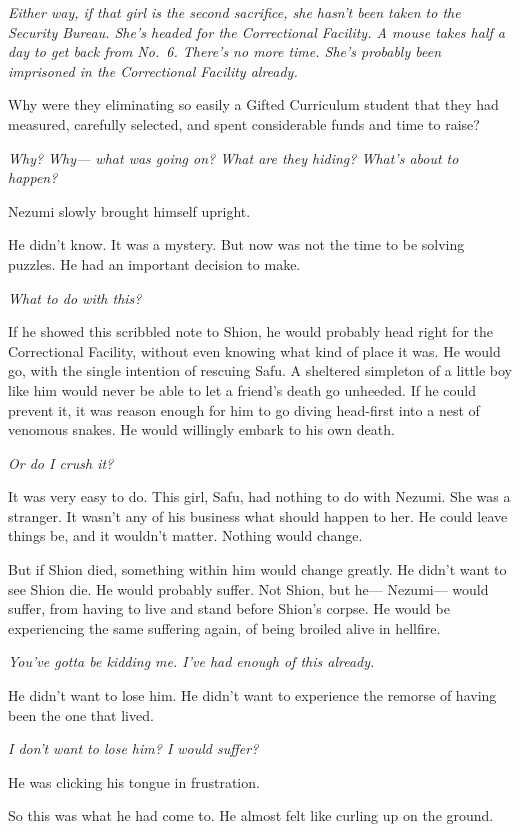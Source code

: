 \emph{Either way, if that girl is the second sacrifice, she hasn't been taken
to the Security Bureau. She's headed for the Correctional Facility. A
mouse takes half a day to get back from No.~6. There's no more time.
She's probably been imprisoned in the Correctional Facility already.}

Why were they eliminating so easily a Gifted Curriculum student that
they had measured, carefully selected, and spent considerable funds and
time to raise?

\emph{Why? Why--- what was going on? What are they hiding? What's about to
happen?}

Nezumi slowly brought himself upright.

He didn't know. It was a mystery. But now was not the time to be solving
puzzles. He had an important decision to make.

\emph{What to do with this?}

If he showed this scribbled note to Shion, he would probably head right
for the Correctional Facility, without even knowing what kind of place
it was. He would go, with the single intention of rescuing Safu. A
sheltered simpleton of a little boy like him would never be able to let
a friend's death go unheeded. If he could prevent it, it was reason
enough for him to go diving head-first into a nest of venomous snakes.
He would willingly embark to his own death.

\emph{Or do I crush it?}

It was very easy to do. This girl, Safu, had nothing to do with Nezumi.
She was a stranger. It wasn't any of his business what should happen to
her. He could leave things be, and it wouldn't matter. Nothing would
change.

But if Shion died, something within him would change greatly. He didn't
want to see Shion die. He would probably suffer. Not Shion, but he---
Nezumi--- would suffer, from having to live and stand before Shion's
corpse. He would be experiencing the same suffering again, of being
broiled alive in hellfire.

\emph{You've gotta be kidding me. I've had enough of this already.}

He didn't want to lose him. He didn't want to experience the remorse of
having been the one that lived.

\emph{I don't want to lose him? I would suffer?}

He was clicking his tongue in frustration.

So this was what he had come to. He almost felt like curling up on the
ground.

